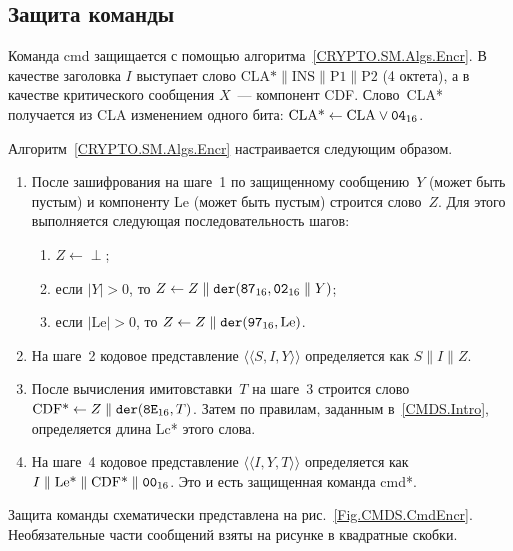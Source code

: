 \subsection{Защита команды}\label{CMDS.SM.EncrCmd}

Команда cmd защищается с помощью алгоритма~\ref{CRYPTO.SM.Algs.Encr}. 
%
В качестве заголовка $I$ выступает слово 
$\text{CLA*} \parallel \text{INS} \parallel \text{P1} \parallel \text{P2}$ 
(4 октета), а в качестве критического сообщения $X$~--- компонент CDF. 
%
Слово~CLA* получается из CLA изменением одного бита:
$\text{CLA*}\leftarrow\text{CLA}\vee\texttt{04}_{16}$.

Алгоритм~\ref{CRYPTO.SM.Algs.Encr} настраивается следующим образом.
\begin{enumerate}
\item
После зашифрования на шаге~1 по защищенному сообщению~$Y$
(может быть пустым) и компоненту Le (может быть пустым)
строится слово~$Z$. Для этого выполняется следующая 
последовательность шагов:
\begin{enumerate}
\item
$Z \gets\perp$;
\item
если $|Y|>0$, то $Z\gets Z\parallel\texttt{der}(\texttt{87}_{16},\texttt{02}_{16}\parallel Y)$;
\item
если $|\text{Le}|>0$, то $Z\gets Z\parallel\texttt{der}(\texttt{97}_{16}, \text{Le})$.
\end{enumerate}
\item
На шаге~2 кодовое представление $\langle\langle S,I,Y\rangle\rangle$
определяется как $S\parallel I\parallel Z$.
\item
После вычисления имитовставки~$T$ на шаге~3 строится слово
$\text{CDF*}\gets Z\parallel \texttt{der}(\texttt{8E}_{16}, T)$.
Затем по правилам, заданным в~\ref{CMDS.Intro}, определяется длина Lc* этого 
слова.
\item
На шаге~4 кодовое представление $\langle\langle I,Y,T\rangle\rangle$
определяется как $I\parallel\text{Le*}\parallel\text{CDF*}\parallel\texttt{00}_{16}$.
Это и есть защищенная команда cmd*.
\end{enumerate}

Защита команды схематически представлена на рис.~\ref{Fig.CMDS.CmdEncr}. 
Необязательные части сообщений взяты на рисунке в квадратные скобки.

